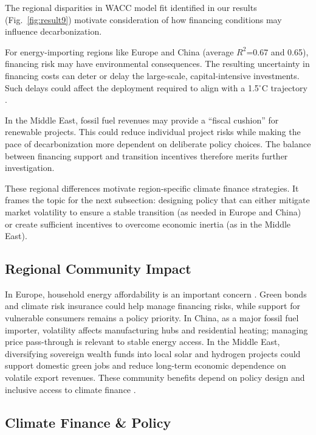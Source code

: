The regional disparities in WACC model fit identified in our results (Fig.~\ref{fig:result9}) motivate consideration of how financing conditions may influence decarbonization.

For energy-importing regions like Europe and China (average $R^2$=0.67 and 0.65), financing risk may have environmental consequences. The resulting uncertainty in financing costs can deter or delay the large-scale, capital-intensive investments. Such delays could affect the deployment required to align with a 1.5$^\circ$C trajectory \cite{ameli2021higher}.

In the Middle East, fossil fuel revenues may provide a ``fiscal cushion'' for renewable projects. This could reduce individual project risks while making the pace of decarbonization more dependent on deliberate policy choices. The balance between financing support and transition incentives therefore merits further investigation.

These regional differences motivate region-specific climate finance strategies. It frames the topic for the next subsection: designing policy that can either mitigate market volatility to ensure a stable transition (as needed in Europe and China) or create sufficient incentives to overcome economic inertia (as in the Middle East).

\subsection{Regional Community Impact}

In Europe, household energy affordability is an important concern \cite{bouzarovski2017energy}. Green bonds and climate risk insurance could help manage financing risks, while support for vulnerable consumers remains a policy priority. In China, as a major fossil fuel importer, volatility affects manufacturing hubs and residential heating; managing price pass-through is relevant to stable energy access. In the Middle East, diversifying sovereign wealth funds into local solar and hydrogen projects could support domestic green jobs and reduce long-term economic dependence on volatile export revenues. These community benefits depend on policy design and inclusive access to climate finance \cite{oecd2021financing}.

\subsection{Climate Finance \& Policy}

